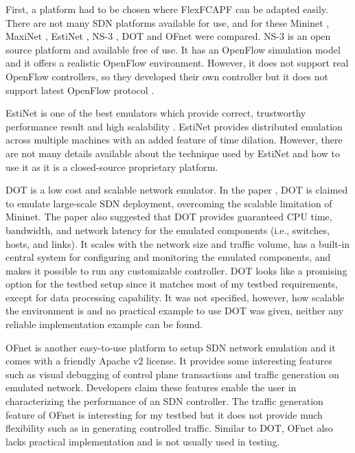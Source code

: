 First, a platform had to be chosen where FlexFCAPF can be adapted easily. There are not many SDN platforms available for use, and for these Mininet \cite{Lantz:2010:NLR:1868447.1868466}, MaxiNet \cite{6857078}, EstiNet \cite{6588659}, NS-3 \cite{ns-3}, DOT \cite{6838241} and OFnet \cite{ofnet} were compared. NS-3 is an open source platform and available free of use. It has an OpenFlow simulation model and it offers a realistic OpenFlow environment. However, it does not support real OpenFlow controllers, so they developed their own controller but it does not support latest OpenFlow protocol \cite{al2014survey}. 

EstiNet is one of the best emulators which provide correct, trustworthy performance result and high scalability \cite{6588659}. EstiNet provides distributed emulation across multiple machines with an added feature of time dilation. However, there are not many details available about the technique used by EstiNet and how to use it as it is a closed-source proprietary platform. 

DOT is a low cost and scalable network emulator. In the paper \cite{6838241}, DOT is claimed to emulate large-scale SDN deployment, overcoming the scalable limitation of Mininet. The paper also suggested that DOT provides guaranteed CPU time, bandwidth, and network latency for the emulated components (i.e., switches, hosts, and links). It scales with the network size and traffic volume, has a built-in central system for configuring and monitoring the emulated components, and makes it possible to run any customizable controller. DOT looks like a promising option for the testbed setup since it matches most of my testbed requirements, except for data processing capability. It was not specified, however, how scalable the environment is and no practical example to use DOT was given, neither any reliable implementation example can be found. 

OFnet is another easy-to-use platform to setup SDN network emulation and it comes with a friendly Apache v2 license. It provides some interesting features such as visual debugging of control plane transactions and traffic generation on emulated network. Developers claim these features enable the user in characterizing the performance of an SDN controller. The traffic generation feature of OFnet is interesting for my testbed but it does not provide much flexibility such as in generating controlled traffic. Similar to DOT, OFnet also lacks practical implementation and is not usually used in testing. 

